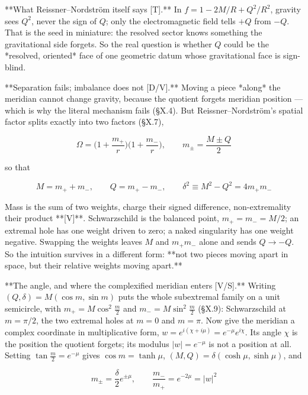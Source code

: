 **What Reissner–Nordström itself says [T].** In $f = 1-2M/R+Q^2/R^2$, gravity sees $Q^2$, never the sign of $Q$; only the electromagnetic field tells $+Q$ from $-Q$. That is the seed in miniature: the resolved sector knows something the gravitational side forgets. So the real question is whether $Q$ could be the *resolved, oriented* face of one geometric datum whose gravitational face is sign-blind.

**Separation fails; imbalance does not [D/V].** Moving a piece *along* the meridian cannot change gravity, because the quotient forgets meridian position — which is why the literal mechanism fails (§X.4). But Reissner–Nordström's spatial factor splits exactly into two factors (§X.7),

$$\Omega = \Big(1+\frac{m_+}{r}\Big)\Big(1+\frac{m_-}{r}\Big),\qquad m_\pm = \frac{M\pm Q}{2}$$

so that

$$M = m_++m_-,\qquad Q = m_+-m_-,\qquad \delta^2\equiv M^2-Q^2 = 4m_+m_-$$

Mass is the sum of two weights, charge their signed difference, non-extremality their product **[V]**. Schwarzschild is the balanced point, $m_+ = m_- = M/2$; an extremal hole has one weight driven to zero; a naked singularity has one weight negative. Swapping the weights leaves $M$ and $m_+m_-$ alone and sends $Q\to-Q$. So the intuition survives in a different form: **not two pieces moving apart in space, but their relative weights moving apart.**

**The angle, and where the complexified meridian enters [V/S].** Writing $(Q,\delta) = M(\cos m,\sin m)$ puts the whole subextremal family on a unit semicircle, with $m_+ = M\cos^2\tfrac m2$ and $m_- = M\sin^2\tfrac m2$ (§X.9): Schwarzschild at $m = \pi/2$, the two extremal holes at $m = 0$ and $m = \pi$. Now give the meridian a complex coordinate in multiplicative form, $w = e^{i(\chi+i\mu)} = e^{-\mu}e^{i\chi}$. Its angle $\chi$ is the position the quotient forgets; its modulus $|w| = e^{-\mu}$ is not a position at all. Setting $\tan\tfrac m2 = e^{-\mu}$ gives $\cos m = \tanh\mu$, $(M,Q) = \delta(\cosh\mu,\sinh\mu)$, and

$$m_\pm = \frac{\delta}{2}e^{\pm\mu},\qquad \frac{m_-}{m_+} = e^{-2\mu} = |w|^2$$

